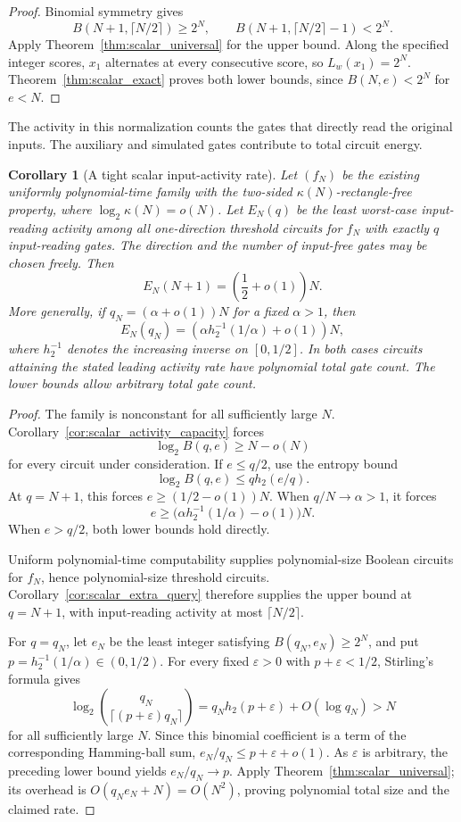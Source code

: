 \documentclass[11pt]{article}
\newtheorem{corollary}[theorem]{Corollary}
\theoremstyle{definition}
\begin{document}
\begin{proof}
Binomial symmetry gives
\[
 B(N+1,\lceil N/2\rceil)\ge2^N,
 \qquad
 B(N+1,\lceil N/2\rceil-1)<2^N.
\]
Apply Theorem~\ref{thm:scalar_universal} for the upper bound. Along the specified integer scores, \(x_1\) alternates at every consecutive score, so \(L_w(x_1)=2^N\). Theorem~\ref{thm:scalar_exact} proves both lower bounds, since \(B(N,e)<2^N\) for \(e<N\).
\end{proof}

The activity in this normalization counts the gates that directly read the original inputs. The auxiliary and simulated gates contribute to total circuit energy.

\begin{corollary}[A tight scalar input-activity rate]\label{cor:scalar_tight_rate}
Let \((f_N)\) be the existing uniformly polynomial-time family with the two-sided \(\kappa(N)\)-rectangle-free property, where \(\log_2\kappa(N)=o(N)\). Let \(E_N(q)\) be the least worst-case input-reading activity among all one-direction threshold circuits for \(f_N\) with exactly \(q\) input-reading gates. The direction and the number of input-free gates may be chosen freely. Then
\[
 E_N(N+1)=\left(\frac12+o(1)\right)N.
\]
More generally, if \(q_N=(\alpha+o(1))N\) for a fixed \(\alpha>1\), then
\[
 E_N(q_N)
 =\left(\alpha h_2^{-1}(1/\alpha)+o(1)\right)N,
\]
where \(h_2^{-1}\) denotes the increasing inverse on \([0,1/2]\). In both cases circuits attaining the stated leading activity rate have polynomial total gate count. The lower bounds allow arbitrary total gate count.
\end{corollary}

\begin{proof}
The family is nonconstant for all sufficiently large \(N\). Corollary~\ref{cor:scalar_activity_capacity} forces
\[
 \log_2 B(q,e)\ge N-o(N)
\]
for every circuit under consideration. If \(e\le q/2\), use the entropy bound
\[
 \log_2 B(q,e)\le qh_2(e/q).
\]
At \(q=N+1\), this forces \(e\ge(1/2-o(1))N\). When \(q/N\to\alpha>1\), it forces
\[
 e\ge\bigl(\alpha h_2^{-1}(1/\alpha)-o(1)\bigr)N.
\]
When \(e>q/2\), both lower bounds hold directly.

Uniform polynomial-time computability supplies polynomial-size Boolean circuits for \(f_N\), hence polynomial-size threshold circuits. Corollary~\ref{cor:scalar_extra_query} therefore supplies the upper bound at \(q=N+1\), with input-reading activity at most \(\lceil N/2\rceil\).

For \(q=q_N\), let \(e_N\) be the least integer satisfying \(B(q_N,e_N)\ge2^N\), and put \(p=h_2^{-1}(1/\alpha)\in(0,1/2)\). For every fixed \(\varepsilon>0\) with \(p+\varepsilon<1/2\), Stirling's formula gives
\[
 \log_2\binom{q_N}{\lceil(p+\varepsilon)q_N\rceil}
 =q_Nh_2(p+\varepsilon)+O(\log q_N)>N
\]
for all sufficiently large \(N\). Since this binomial coefficient is a term of the corresponding Hamming-ball sum, \(e_N/q_N\le p+\varepsilon+o(1)\). As \(\varepsilon\) is arbitrary, the preceding lower bound yields \(e_N/q_N\to p\). Apply Theorem~\ref{thm:scalar_universal}; its overhead is \(O(q_Ne_N+N)=O(N^2)\), proving polynomial total size and the claimed rate.
\end{proof}
\end{document}
